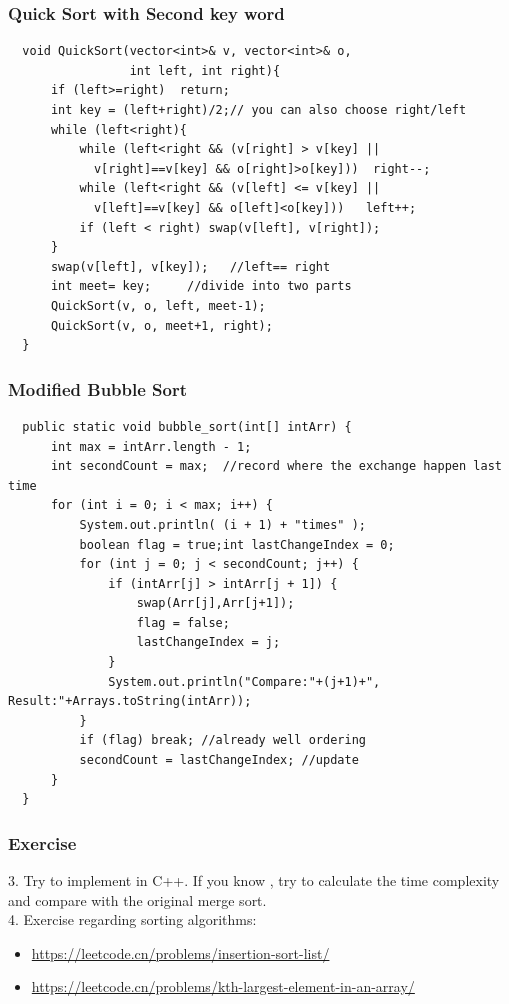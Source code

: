 \documentclass{beamer}
\begin{document}
\begin{frame}[fragile]
    \frametitle{Quick Sort with Second key word}

    \begin{verbatim}
  void QuickSort(vector<int>& v, vector<int>& o,
                 int left, int right){
      if (left>=right)  return;
      int key = (left+right)/2;// you can also choose right/left
      while (left<right){
          while (left<right && (v[right] > v[key] || 
            v[right]==v[key] && o[right]>o[key]))  right--;
          while (left<right && (v[left] <= v[key] || 
            v[left]==v[key] && o[left]<o[key]))   left++;  
          if (left < right) swap(v[left], v[right]);   
      }
      swap(v[left], v[key]);   //left== right
      int meet= key;     //divide into two parts
      QuickSort(v, o, left, meet-1); 
      QuickSort(v, o, meet+1, right); 
  }
    \end{verbatim}

\end{frame}
\begin{frame}[fragile]
    \frametitle{Modified Bubble Sort}
    \begin{verbatim}
  public static void bubble_sort(int[] intArr) {
      int max = intArr.length - 1;
      int secondCount = max;  //record where the exchange happen last time
      for (int i = 0; i < max; i++) {
          System.out.println( (i + 1) + "times" );
          boolean flag = true;int lastChangeIndex = 0;
          for (int j = 0; j < secondCount; j++) {
              if (intArr[j] > intArr[j + 1]) {
                  swap(Arr[j],Arr[j+1]);
                  flag = false;
                  lastChangeIndex = j;
              }
              System.out.println("Compare:"+(j+1)+", Result:"+Arrays.toString(intArr));
          }
          if (flag) break; //already well ordering
          secondCount = lastChangeIndex; //update
      }
  }
    \end{verbatim}
\end{frame}
\begin{frame}
    \frametitle{Exercise}
    3. Try to implement  in C++.
    If you know , try to calculate the time complexity and compare with the 
    original merge sort.
    \vs{4em}\\
    4. Exercise regarding sorting algorithms:
    \begin{itemize}
        \item \url{https://leetcode.cn/problems/insertion-sort-list/}
        \item \url{https://leetcode.cn/problems/kth-largest-element-in-an-array/}
    \end{itemize}
\end{frame}
\end{document}
